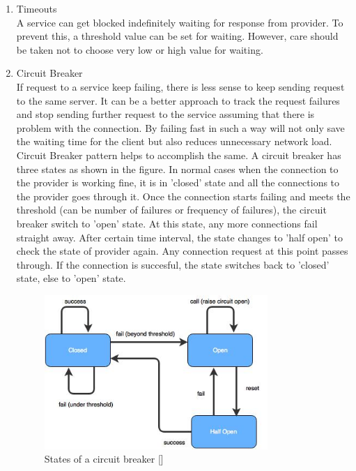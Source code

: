 \begin{enumerate}
\item Timeouts \\ A service can get blocked indefinitely waiting for response from provider. To prevent this, a threshold value can be set for waiting. However, care should be taken not to choose very low or high value for waiting. 
\item Circuit Breaker \\ If request to a service keep failing, there is less sense to keep sending request to the same server. It can be a better approach to track the request failures and stop sending further request to the service assuming that there is problem with the connection. By failing fast in such a way will not only save the waiting time for the client but also reduces unnecessary network load. Circuit Breaker pattern helps to accomplish the same. A circuit breaker has three states as shown in the figure. In normal cases when the connection to the provider is working fine, it is in 'closed' state and all the connections to the provider goes through it. Once the connection starts failing and meets the threshold (can be number of failures or frequency of failures), the circuit breaker switch to 'open' state. At this state, any more connections fail straight away. After certain time interval, the state changes to 'half open' to check the state of provider again. Any connection request at this point passes through. If the connection is succesful, the state switches back to 'closed' state, else to 'open' state.\cite{Fowler:2014ac} \cite{Newman:2015aa} \cite{Nygard:2007aa}
\begin{figure}[H]
\begin{center}
\includegraphics[width=0.8\textwidth]{figures/challanges_three_circuit_breaker}
\caption{States of a circuit breaker [\cite{Fowler:2014ac}]}

\end{center}
\end{figure}
\end{enumerate}
